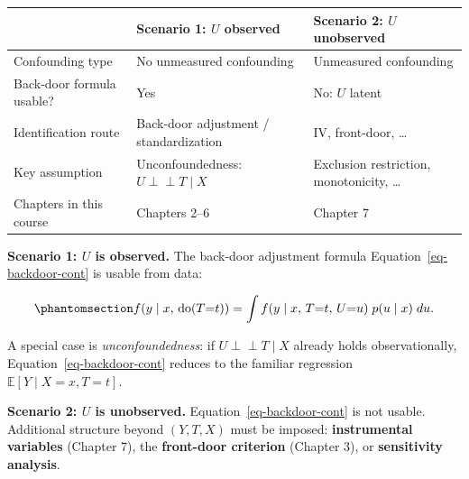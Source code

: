 \documentclass[
  a4paper,
]{book}
\newcounter{none} %
\newcommand{\doop}{\operatorname{do}}
\newcommand{\indep}{\perp\!\!\!\perp}
\newcommand{\E}{\mathbb{E}}
\begin{document}
{\def\LTcaptype{none} %
\begin{longtable}[]{@{}
  >{\raggedright\arraybackslash}p{}
  >{\raggedright\arraybackslash}p{}
  >{\raggedright\arraybackslash}p{}@{}}
\toprule\noalign{}
\begin{minipage}[b]{\linewidth}\raggedright
\end{minipage} & \begin{minipage}[b]{\linewidth}\raggedright
\textbf{Scenario 1: \(U\) observed}
\end{minipage} & \begin{minipage}[b]{\linewidth}\raggedright
\textbf{Scenario 2: \(U\) unobserved}
\end{minipage} \\
\midrule\noalign{}
\endhead
\bottomrule\noalign{}
\endlastfoot
Confounding type & No unmeasured confounding & Unmeasured confounding \\
Back-door formula usable? & Yes & No: \(U\) latent \\
Identification route & Back-door adjustment / standardization & IV,
front-door, \ldots{} \\
Key assumption & Unconfoundedness: \(U \indep T \mid X\) & Exclusion
restriction, monotonicity, \ldots{} \\
Chapters in this course & Chapters 2--6 & Chapter 7 \\
\end{longtable}
}

\textbf{Scenario 1: \(U\) is observed.} The back-door adjustment formula
Equation~\ref{eq-backdoor-cont} is usable from data:

\begin{equation}\protect\phantomsection\label{eq-backdoor-cont}{f(y \mid x,\, \doop(T{=}t)) = \int f(y \mid x,\, T{=}t,\, U{=}u)\; p(u \mid x)\; du.}\end{equation}

A special case is \emph{unconfoundedness}: if \(U \indep T \mid X\)
already holds observationally, Equation~\ref{eq-backdoor-cont} reduces
to the familiar regression \(\E[Y \mid X{=}x, T{=}t]\).

\textbf{Scenario 2: \(U\) is unobserved.}
Equation~\ref{eq-backdoor-cont} is not usable. Additional structure
beyond \((Y, T, X)\) must be imposed: \textbf{instrumental variables}
(Chapter 7), the \textbf{front-door criterion} (Chapter 3), or
\textbf{sensitivity analysis}.
\end{document}
